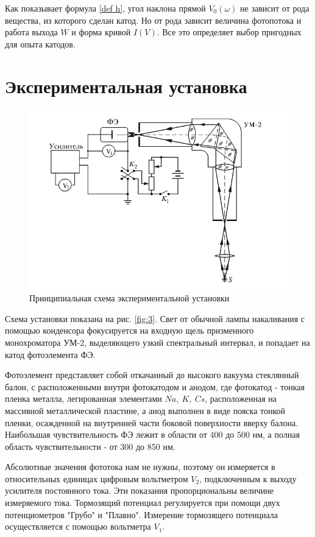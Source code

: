\documentclass[a4paper,12pt]{article}
\begin{document}
Как показывает формула \eqref{def h}, угол наклона прямой $V
_0(\omega)$ не зависит от рода вещества, из которого сделан катод. Но от рода зависит величина фотопотока и работа выхода $W$ и форма кривой $I(V)$. Все это определяет выбор пригодных для опыта катодов.

\section{Экспериментальная установка}
\begin{figure}[h!]
    \centering
    \includegraphics[scale = 0.4]{Screenshot 2023-09-08 at 11.24.59 AM.png}
    \caption{Принципиальная схема экспериментальной установки}
    \label{fig:3}
\end{figure}


    
Схема установки показана на рис. \eqref{fig:3}. Свет от обычной лампы накаливания с помощью конденсора фокусируется на входную щель призменного монохроматора УМ-2, выделяющего узкий спектральный интервал, и попадает на катод фотоэлемента ФЭ. 

Фотоэлемент представляет собой откачанный до высокого вакуума стеклянный балон, с расположенными внутри фотокатодом и анодом, где фотокатод - тонкая пленка металла, легированная элементами $Na, ~K, ~Cs$, расположенная на массивной металлической пластине, а анод выполнен в виде пояска тонкой пленки, осажденной на внутренней части боковой поверхности вверху балона. Наибольшая чувствительность ФЭ лежит в области от 400 до 500 нм, а полная область чувствительности - от 300 до 850 нм. 

Абсолютные значения фототока нам не нужны, поэтому он измеряется в относительных единицах цифровым вольтметром $V_2$, подключенным к выходу усилителя постоянного тока. Эти показания пропорциональны величине измеряемого тока. Тормозящий потенциал регулируется при помощи двух потенциометров "Грубо" и "Плавно". Измерение тормозящего потенциала осуществляется с помощью вольтметра $V_1$. 
\newpage{}
\end{document}
